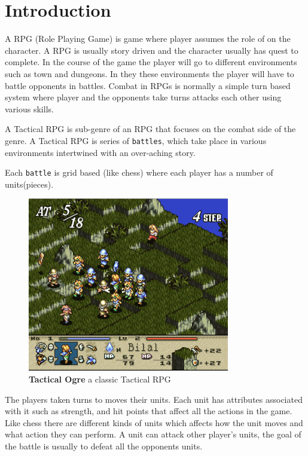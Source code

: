  
\renewcommand{\theTitle}{A Tactical RPG Engine}
\renewcommand{\theAuthor}{\fullName}

 
\maketitle

\section{Introduction} \label{introduction}

A RPG (Role Playing Game) is game where player assumes the role of on the character. A RPG is usually story driven and the character usually has quest to complete. In the course of the game the player will go to different environments such as town and dungeons. In they these environments the player will have to battle opponents in battles. Combat in RPGs is normally a simple turn based system where player and the opponents take turns attacks each other using various skills. 

A Tactical RPG is sub-genre of an RPG that focuses on the combat side of the genre. A Tactical RPG is series of \texttt{battles}, which take place in various environments intertwined with an over-aching story.

Each \texttt{battle} is grid based (like chess) where each player has a number of units(pieces). 
\begin{figure}
	[htbp] \centering 
	\includegraphics[height=3in]{figures/TRPG.png} \caption{\textbf{Tactical Ogre} a classic Tactical RPG } \label{fig:figures_TRPG} 
\end{figure}
The players taken turns to moves their units. Each unit has attributes associated with it such as strength, and hit points that affect all the actions in the game. Like chess there are different kinds of units which affects how the unit moves and what action they can perform. A unit can attack other player's units, the goal of the battle is usually to defeat all the opponents units.

